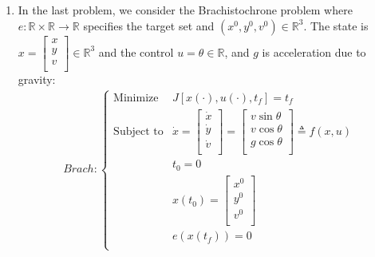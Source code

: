 \documentclass[10pt]{article}
\newcommand{\mat}[2][ccccccccccccccc]{\left [\!\!\begin{array}{#1} #2\\ \end{array} \!\!\right]}
\newcommand{\piece}[2][cll]{\left \{\begin{array}{#1} #2\\ \end{array} \right. }
\newcommand{\bbr}{\mathbb{R}}
\begin{document}
\begin{enumerate}[leftmargin=*]
\item In the last problem, we consider the Brachistochrone problem where $e:\bbr\times\bbr\longrightarrow\bbr$ specifies the target set and $(x^0, y^0,v^0)\in\bbr^3$.  The state is $x=\mat{x\\y\\v}\in\bbr^3$ and the control $u=\theta\in\bbr$, and $g$ is acceleration due to gravity:
    \begin{align*}
            Brach: \piece{ \text{Minimize} & J[x(\cdot), u(\cdot), t_f] = t_f \\
                       \text{Subject to} & \dot x = \mat{\dot x \\ \dot y \\ \dot v} = \mat{ v\sin\theta \\ v\cos\theta \\ g\cos\theta}\triangleq f(x,u) \\
                       & t_0 = 0 \\
                       & x(t_0)=\mat{x^0\\y^0\\v^0} \\
                       & e(x(t_f))=0
                      }
    \end{align*}


\end{enumerate}
\end{document}
